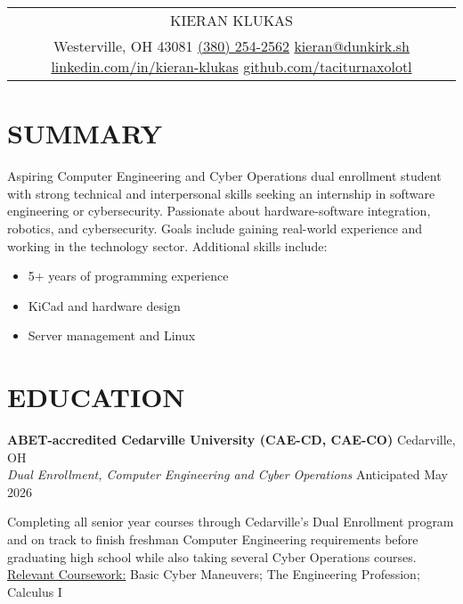 \documentclass[a4paper,10pt]{article}
\newlength{\mpwidth}
\begin{document}
\pagestyle{empty}


\begin{tabularx}{\linewidth}{@{} C @{}}
\Huge{KIERAN KLUKAS} \\[8pt]
Westerville, OH 43081 \textbar{} \href{tel:+13802542562}{(380) 254-2562} \textbar{} \href{mailto:kieran@dunkirk.sh}{kieran@dunkirk.sh} \textbar{} \href{https://linkedin.com/in/kieran-klukas}{linkedin.com/in/kieran-klukas} \textbar{} \href{https://github.com/taciturnaxolotl}{github.com/taciturnaxolotl}
\end{tabularx}

\section{SUMMARY}
Aspiring Computer Engineering and Cyber Operations dual enrollment student with strong technical and interpersonal skills seeking an internship in software engineering or cybersecurity. Passionate about hardware-software integration, robotics, and cybersecurity. Goals include gaining real-world experience and working in the technology sector. Additional skills include:
\begin{itemize}[nosep,leftmargin=1em, itemsep=3pt,label=$\bullet$]
\item 5+ years of programming experience
\item KiCad and hardware design
\item Server management and Linux
\end{itemize}

\section{EDUCATION}

\textbf{ABET-accredited Cedarville University (CAE-CD, CAE-CO)} \hfill Cedarville, OH\\
\textit{Dual Enrollment, Computer Engineering and Cyber Operations} \hfill Anticipated May 2026\\
\begin{minipage}{\mpwidth}
Completing all senior year courses through Cedarville’s Dual Enrollment program and on track to finish freshman Computer Engineering requirements before graduating high school while also taking several Cyber Operations courses.\\
\underline{Relevant Coursework:} Basic Cyber Maneuvers; The Engineering Profession; Calculus I
\end{minipage}
\end{document}
